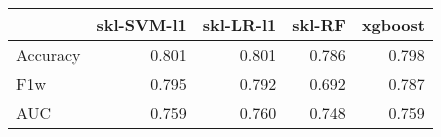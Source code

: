 \begin{tabular}{lrrrr}
\toprule
{} &  skl-SVM-l1 &  skl-LR-l1 &  skl-RF &  xgboost \\
\midrule
Accuracy &       0.801 &      0.801 &   0.786 &    0.798 \\
F1w      &       0.795 &      0.792 &   0.692 &    0.787 \\
AUC      &       0.759 &      0.760 &   0.748 &    0.759 \\
\bottomrule
\end{tabular}
